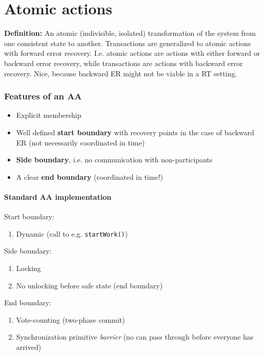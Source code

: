 \part{Atomic actions}
\textbf{Definition:} An atomic (indivisible, isolated) transformation of the system from one consistent state to another. Transactions are generalized to atomic actions with forward error recovery. I.e. atomic actions are actions with either forward or backward error recovery, while transactions are actions with backward error recovery. Nice, because backward ER might not be viable in a RT setting.
\section{Features of an AA}
\begin{itemize}
    \item Explicit membership
    \item Well defined \textbf{start boundary} with recovery points in the case of backward ER (not necessarily coordinated in time)
    \item \textbf{Side boundary}, i.e. no communication with non-participants
    \item A clear \textbf{end boundary} (coordinated in time!)
\end{itemize}
\subsection{Standard AA implementation}
Start boundary:
\begin{enumerate}
    \item Dynamic (call to e.g. \texttt{startWork()})
\end{enumerate}
Side boundary:
\begin{enumerate}
    \item Locking
    \item No unlocking before safe state (end boundary)
\end{enumerate}
End boundary:
\begin{enumerate}
    \item Vote-counting (two-phase commit)
    \item Synchronization primitive \emph{barrier} (no can pass through before everyone has arrived)
\end{enumerate}
